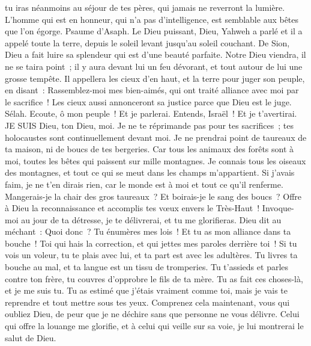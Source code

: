 \begin{multicols}{2}
tu iras néanmoins au séjour de tes pères, qui jamais ne reverront la lumière.
L'homme qui est en honneur, qui n'a pas d'intelligence, est semblable aux bêtes que l'on égorge.
\VerseOne{}Psaume d'Asaph. Le Dieu puissant, Dieu, Yahweh a parlé et il a appelé toute la terre, depuis le soleil levant jusqu'au soleil couchant.
De Sion, Dieu a fait luire sa splendeur qui est d'une beauté parfaite.
Notre Dieu viendra, il ne se taira point~; il y aura devant lui un feu dévorant, et tout autour de lui une grosse tempête.
Il appellera les cieux d'en haut, et la terre pour juger son peuple, en disant~:
Rassemblez-moi mes bien-aimés, qui ont traité alliance avec moi par le sacrifice~!
Les cieux aussi annonceront sa justice parce que Dieu est le juge. Sélah.
Ecoute, ô mon peuple~! Et je parlerai. Entends, Israël~! Et je t'avertirai. JE SUIS Dieu, ton Dieu, moi.
Je ne te réprimande pas pour tes sacrifices~; tes holocaustes sont continuellement devant moi.
Je ne prendrai point de taureaux de ta maison, ni de boucs de tes bergeries.
Car tous les animaux des forêts sont à moi, toutes les bêtes qui paissent sur mille montagnes.
Je connais tous les oiseaux des montagnes, et tout ce qui se meut dans les champs m'appartient.
Si j'avais faim, je ne t'en dirais rien, car le monde est à moi et tout ce qu'il renferme.
Mangerais-je la chair des gros taureaux~? Et boirais-je le sang des boucs~?
Offre à Dieu la reconnaissance et accomplis tes vœux envers le Très-Haut~!
Invoque-moi au jour de ta détresse, je te délivrerai, et tu me glorifieras.
Dieu dit au méchant~: Quoi donc~? Tu énumères mes lois~! Et tu as mon alliance dans ta bouche~!
Toi qui hais la correction, et qui jettes mes paroles derrière toi~!
Si tu vois un voleur, tu te plais avec lui, et ta part est avec les adultères.
Tu livres ta bouche au mal, et ta langue est un tissu de tromperies.
Tu t'assieds et parles contre ton frère, tu couvres d'opprobre le fils de ta mère.
Tu as fait ces choses-là, et je me suis tu. Tu as estimé que j'étais vraiment comme toi, mais je vais te reprendre et tout mettre sous tes yeux.
Comprenez cela maintenant, vous qui oubliez Dieu, de peur que je ne déchire sans que personne ne vous délivre.
Celui qui offre la louange me glorifie, et à celui qui veille sur sa voie, je lui montrerai le salut de Dieu.

\end{multicols}
